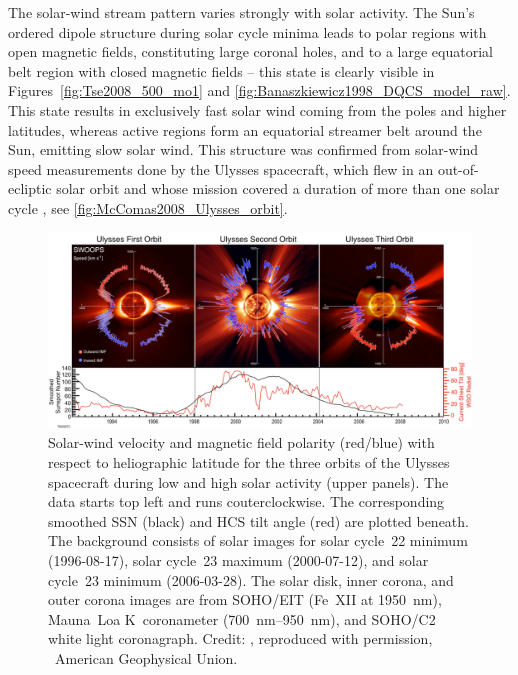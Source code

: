 The solar-wind stream pattern varies strongly with solar activity. The Sun's ordered dipole structure during solar cycle minima leads to polar regions with open magnetic fields, constituting large coronal holes, and to a large equatorial belt region with closed magnetic fields -- this state is clearly visible in Figures~\ref{fig:Tse2008_500_mo1} and \ref{fig:Banaszkiewicz1998_DQCS_model_raw}. This state results in exclusively fast solar wind coming from the poles and higher latitudes, whereas active regions form an equatorial streamer belt around the Sun, emitting slow solar wind. This structure was confirmed from solar-wind speed measurements done by the Ulysses spacecraft, which flew in an out-of-ecliptic solar orbit and whose mission covered a duration of more than one solar cycle \citep{McComas200809}, see \autoref{fig:McComas2008_Ulysses_orbit}.
\begin{figure}[htb]
	\centering
	\includegraphics[width=\textwidth]{figures_of_others/images/McComas2008_Ulysses_orbit_.png}
	\caption{Solar-wind velocity and magnetic field polarity (red/blue) with respect to heliographic latitude for the three orbits of the Ulysses spacecraft during low and high solar activity (upper panels). The data starts top left and runs couterclockwise. The corresponding smoothed SSN (black) and HCS tilt angle (red) are plotted beneath. The background consists of solar images for solar cycle~22 minimum (1996-08-17), solar cycle~23 maximum (2000-07-12), and solar cycle~23 minimum (2006-03-28). The solar disk, inner corona, and outer corona images are from SOHO/EIT (Fe~XII at \SI{1950}{\nano\meter}), Mauna~Loa K~coronameter (\SIrange{700}{950}{\nano\meter}), and SOHO/C2 white light coronagraph. Credit: \citet[][Fig.~1]{McComas200809}, reproduced with permission, \textcopyright~American Geophysical Union.}
	\label{fig:McComas2008_Ulysses_orbit}
\end{figure}
